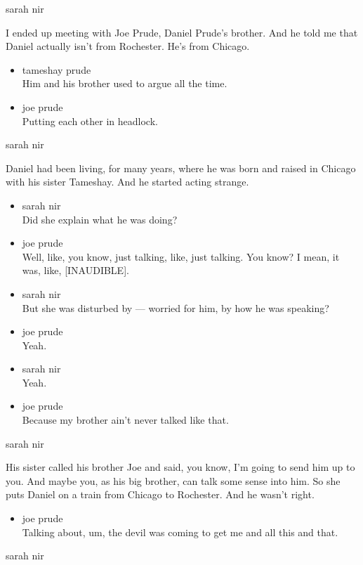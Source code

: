 sarah nir

I ended up meeting with Joe Prude, Daniel Prude's brother. And he told
me that Daniel actually isn't from Rochester. He's from Chicago.

\begin{itemize}
\item
  tameshay prude\\
  Him and his brother used to argue all the time.
\item
  joe prude\\
  Putting each other in headlock.
\end{itemize}

sarah nir

Daniel had been living, for many years, where he was born and raised in
Chicago with his sister Tameshay. And he started acting strange.

\begin{itemize}
\item
  sarah nir\\
  Did she explain what he was doing?
\item
  joe prude\\
  Well, like, you know, just talking, like, just talking. You know? I
  mean, it was, like, {[}INAUDIBLE{]}.
\item
  sarah nir\\
  But she was disturbed by --- worried for him, by how he was speaking?
\item
  joe prude\\
  Yeah.
\item
  sarah nir\\
  Yeah.
\item
  joe prude\\
  Because my brother ain't never talked like that.
\end{itemize}

sarah nir

His sister called his brother Joe and said, you know, I'm going to send
him up to you. And maybe you, as his big brother, can talk some sense
into him. So she puts Daniel on a train from Chicago to Rochester. And
he wasn't right.

\begin{itemize}
\tightlist
\item
  joe prude\\
  Talking about, um, the devil was coming to get me and all this and
  that.
\end{itemize}

sarah nir

